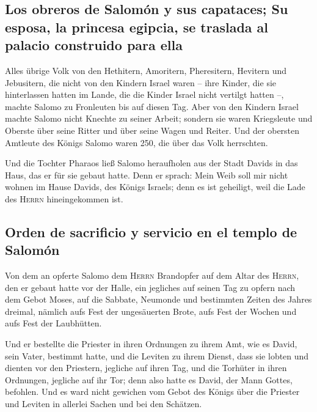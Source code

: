 \hypertarget{los-obreros-de-salomuxf3n-y-sus-capataces-su-esposa-la-princesa-egipcia-se-traslada-al-palacio-construido-para-ella}{%
\subsection{Los obreros de Salomón y sus capataces; Su esposa, la
princesa egipcia, se traslada al palacio construido para
ella}\label{los-obreros-de-salomuxf3n-y-sus-capataces-su-esposa-la-princesa-egipcia-se-traslada-al-palacio-construido-para-ella}}

 Alles übrige Volk von den Hethitern, Amoritern,
Pheresitern, Hevitern und Jebusitern, die nicht von den Kindern Israel
waren --  ihre Kinder, die sie hinterlassen hatten im
Lande, die die Kinder Israel nicht vertilgt hatten --, machte Salomo zu
Fronleuten bis auf diesen Tag.  Aber von den Kindern
Israel machte Salomo nicht Knechte zu seiner Arbeit; sondern sie waren
Kriegsleute und Oberste über seine Ritter und über seine Wagen und
Reiter.  Und der obersten Amtleute des Königs Salomo
waren 250, die über das Volk herrschten.

 Und die Tochter Pharaos ließ Salomo heraufholen aus der
Stadt Davids in das Haus, das er für sie gebaut hatte. Denn er sprach:
Mein Weib soll mir nicht wohnen im Hause Davids, des Königs Israels;
denn es ist geheiligt, weil die Lade des \textsc{Herrn} hineingekommen
ist.

\hypertarget{orden-de-sacrificio-y-servicio-en-el-templo-de-salomuxf3n}{%
\subsection{Orden de sacrificio y servicio en el templo de
Salomón}\label{orden-de-sacrificio-y-servicio-en-el-templo-de-salomuxf3n}}

 Von dem an opferte Salomo dem \textsc{Herrn} Brandopfer
auf dem Altar des \textsc{Herrn}, den er gebaut hatte vor der Halle,
 ein jegliches auf seinen Tag zu opfern nach dem Gebot
Moses, auf die Sabbate, Neumonde und bestimmten Zeiten des Jahres
dreimal, nämlich aufs Fest der ungesäuerten Brote, aufs Fest der Wochen
und aufs Fest der Laubhütten.

 Und er bestellte die Priester in ihren Ordnungen zu
ihrem Amt, wie es David, sein Vater, bestimmt hatte, und die Leviten zu
ihrem Dienst, dass sie lobten und dienten vor den Priestern, jegliche
auf ihren Tag, und die Torhüter in ihren Ordnungen, jegliche auf ihr
Tor; denn also hatte es David, der Mann Gottes, befohlen.
 Und es ward nicht gewichen vom Gebot des Königs über die
Priester und Leviten in allerlei Sachen und bei den Schätzen.

